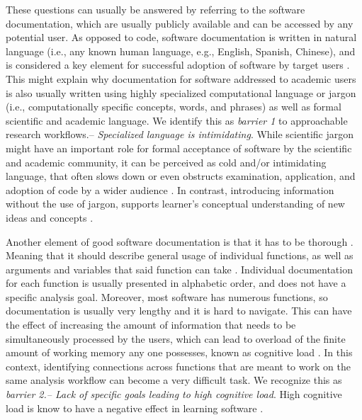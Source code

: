 \documentclass[12pt]{article}
\begin{document}
These questions can usually be answered by referring to the software documentation, which are usually publicly available and can be accessed by any potential user.
As opposed to code, software documentation is written in natural language (i.e., any known human language, e.g., English, Spanish, Chinese), and is considered a key element for successful adoption of software by target users \citep{karimzadeh2018top}. This might explain why documentation for software addressed to academic users is also usually written using highly specialized computational language or jargon (i.e., computationally specific concepts, words, and phrases) as well as formal scientific and academic language.
We identify this as \textit{barrier 1} to approachable research workflows.-- \textit{Specialized language is intimidating}.
While scientific jargon might have an important role for formal acceptance of software by the scientific and academic community, it can be perceived as cold and/or intimidating language, that often slows down or even obstructs examination, application, and adoption of code by a wider audience \citep{ball2017its}.
In contrast, introducing information without the use of jargon, supports learner's conceptual understanding of new ideas and concepts \citep{mcdonnell2016concepts, pan2019online}.

Another element of good software documentation is that it has to be thorough \citep{karimzadeh2018top}.
Meaning that it should describe general usage of individual functions, as well as arguments and variables that said function can take \citep{karimzadeh2018top}.
Individual documentation for each function is usually presented in alphabetic order, and does not have a specific analysis goal.
Moreover, most software has numerous functions, so documentation is usually very lengthy and it is hard to navigate.
This can have the effect of increasing the amount of information that needs to be simultaneously processed by the users, which can lead to overload of the finite amount of working memory any one possesses, known as cognitive load \citep{sweller1988cognitive}.
In this context, identifying connections across functions that are meant to work on the same analysis workflow can become a very difficult task.
We recognize this as \textit{barrier 2.-- Lack of specific goals leading to high cognitive load}.
High cognitive load is know to have a negative effect in learning software \citep{chandler1996cognitive, van2005research, lambert2009student}.
\end{document}
